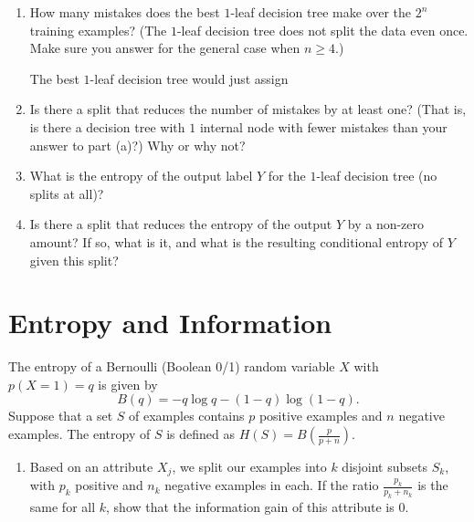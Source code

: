 \documentclass[11pt]{article}
\begin{document}
\begin{enumerate}
\item {} How many mistakes does the best $1$-leaf decision tree make over the $2^n$ training examples? (The $1$-leaf decision tree does not split the data even once. Make sure you answer for the general case when $n \geq 4$.)

\solution{}
The best $1$-leaf decision tree would just assign 

\item {} Is there a split that reduces the number of mistakes by at least one? (That is, is there a decision tree with $1$ internal node with fewer mistakes than your answer to part (a)?) Why or why not?

\item {} What is the entropy of the output label $Y$ for the $1$-leaf decision tree (no splits at all)?

\item {} Is there a split that reduces the entropy of the output $Y$ by a non-zero amount? If so, what is it, and what is the resulting conditional entropy of $Y$ given this split?

\end{enumerate}

\section{Entropy and Information }
The entropy of a Bernoulli (Boolean 0/1) random variable $X$ with $p(X = 1) = q$ is given by
\begin{equation*}
B(q) = - q \log q - (1 - q) \log(1 - q).
\end{equation*}
Suppose that a set $S$ of examples contains $p$ positive examples and $n$ negative examples. The entropy of $S$ is defined as $H(S) = B\left(\frac{p}{p+n}\right)$.
\begin{enumerate}
\item {} Based on an attribute $X_j$, we split our examples into $k$ disjoint subsets $S_k$, with $p_k$ positive and $n_k$ negative examples in each. If the ratio $\tfrac{p_k}{p_k + n_k}$ is the same for all $k$, show that the information gain of this attribute is 0.

\end{enumerate}
\end{document}
